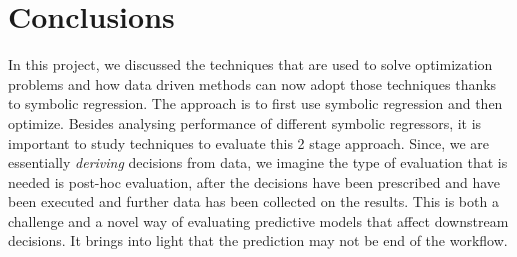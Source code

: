 \documentclass[12pt, letterpaper]{article}
\begin{document}
\section{Conclusions}
In this project, we discussed the techniques that are used to solve optimization
problems and how data driven methods can now adopt those techniques thanks to
symbolic regression. The approach is to first use symbolic regression and then
optimize. Besides analysing performance of different symbolic regressors, it is
important to study techniques to evaluate this 2 stage approach. Since, we are
essentially \textit{deriving} decisions from data, we imagine the type of
evaluation that is needed is post-hoc evaluation, after the decisions have been
prescribed and have been executed and further data has been collected on the
results. This is both a challenge and a novel way of evaluating predictive
models that affect downstream decisions. It brings into light that the
prediction may not be end of the workflow. 

\printbibliography
\end{document}
